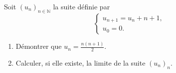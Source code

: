 
\begin{exercice}\label{exoDS2010bis-0004}

Soit $(u_n)_{n\in\mathbb{N}}$ la suite définie par 
\begin{equation}
 \left\{ \begin{array}{ll}
    u_{n+1}=u_n+n+1,\\
    u_0=0.
  \end{array}\right.
\end{equation}
\begin{enumerate}
\item Démontrer que $\displaystyle u_n=\frac{n(n+1)}{2}$.
\item Calculer, si elle existe, la limite de la suite $(u_n)_{n}$.
\end{enumerate}


\end{exercice}
